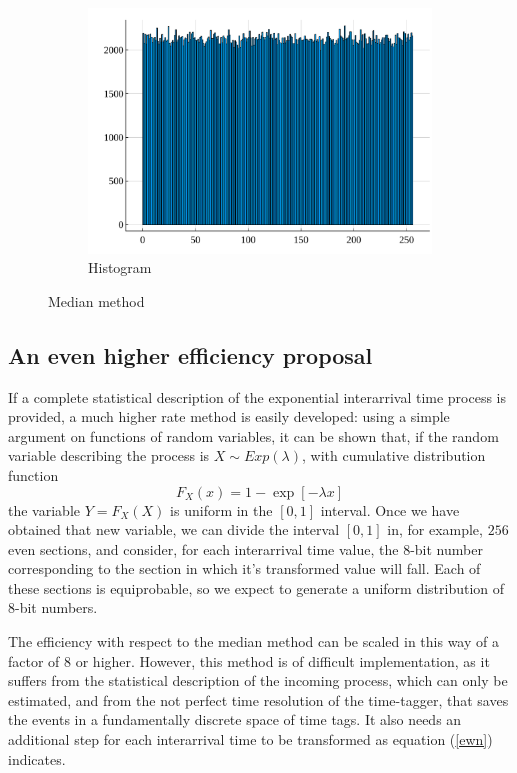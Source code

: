 \documentclass[10pt, final]{article}
\begin{document}
\begin{multicols}{2}
\begin{mdframed}
\begin{figure}[H]
        \begin{subfigure}{\textwidth}
            \centering
            \includegraphics[width = \textwidth]{../random_img/naif-histogram.pdf}
            \caption{Histogram}
        \end{subfigure}
        \caption{Median method}
        \label{median}
    \end{figure}
\end{mdframed}


\subsection*{An even higher efficiency proposal}
If a complete statistical description of the exponential interarrival time process is provided, a much higher rate method is easily developed: using a simple argument on functions of random variables, it can be shown that, if the random variable describing the process is $X \sim Exp(\lambda)$, with cumulative distribution function 
\begin{equation}\label{ewn}
    F_X(x) = 1-\exp[-\lambda x]
\end{equation} 
the variable $Y = F_X(X)$ is uniform in the $[0, 1]$ interval. Once we have obtained that new variable, we can divide the interval $[0, 1]$ in, for example, $256$ even sections, and consider, for each interarrival time value, the $8$-bit number corresponding to the section in which it's transformed value will fall. Each of these sections is equiprobable, so we expect to generate a uniform distribution of $8$-bit numbers. 

The efficiency with respect to the median method can be scaled in this way of a factor of $8$ or higher.
However, this method is of difficult implementation, as it suffers from the  statistical description of the incoming process, which can only be estimated, and from the not perfect time resolution of the time-tagger, that saves the events in a fundamentally discrete space of time tags. It also needs an additional step for each interarrival time to be transformed as equation (\ref{ewn}) indicates.


\end{multicols}
\end{document}
